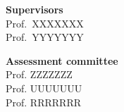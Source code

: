\noindent
\textbf{Supervisors}\\
Prof.\ XXXXXXX \\
Prof.\ YYYYYYY

\vspace{3em}
\noindent
\textbf{Assessment committee}\\
Prof. ZZZZZZZ \\
Prof. UUUUUUU \\
Prof. RRRRRRR \\

\clearpage
